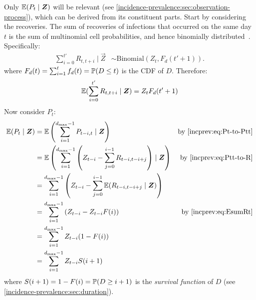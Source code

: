 \documentclass[thesis.tex]{subfiles}
\begin{document}
Only $\operatorname{\mathbb{E}}(P_t \mid \bm{Z})$ will be relevant (see \cref{incidence-prevalence:sec:observation-process}), which can be derived from its constituent parts.
Start by considering the recoveries.
The sum of recoveries of infections that occurred on the same day $t$ is the sum of multinomial cell probabilities, and hence binomially distributed~\autocite{alamAnalysis}.
Specifically:
\begin{align}
  \sum_{i=0}^{t'} R_{t,t+i} \mid \vec{Z} &\sim \text{Binomial}(Z_t, F_d(t'+1)).
\end{align}
where $F_d(t) = \sum_{i=1}^t f_d(t) = \operatorname{\mathbb{P}}(D \leq t)$ is the CDF of $D$.
Therefore:
\begin{align}
  \operatorname{\mathbb{E}}(\sum_{i=0}^{t'} R_{t,t+i} \mid \bm{Z}) = Z_t F_d(t'+1) \label{incprev:eq:EsumRt}
\end{align}
Now consider $P_t$:
\begin{align}
\E(P_t \mid \vec{Z})
  &= \E\left(\sum_{i=1}^{d_\text{max}-1} P_{t-i,t} \mid \vec{Z} \right) &\text{by \cref{incprev:eq:Pt-to-Ptt}} \\
  &= \E\left(\sum_{i=1}^{d_\text{max}-1} \left( Z_{t-i} - \sum_{j=0}^{i-1} R_{t-i,t-i+j} \right) \mid \vec{Z} \right) &\text{by \cref{incprev:eq:Ptt-to-R}}\\
  &= \sum_{i=1}^{d_\text{max}-1} \left( Z_{t-i} - \sum_{j=0}^{i-1} \E( R_{t-i,t-i+j} \mid \vec{Z}) \right) \\
  &= \sum_{i=1}^{d_\text{max}-1} \left( Z_{t-i} - Z_{t-i} F(i) \right) &\text{by \cref{incprev:eq:EsumRt}}\\
  &= \sum_{i=1}^{d_\text{max}-1} Z_{t-i} (1 - F(i)) \\
  &= \sum_{i=1}^{d_\text{max}-1} Z_{t-i} S(i+1)
\end{align}
where $S(i+1) = 1-F(i) = \operatorname{\mathbb{P}}(D \geq i+1)$ is the \emph{survival function} of $D$ (see \cref{incidence-prevalence:sec:duration}).


\end{document}
